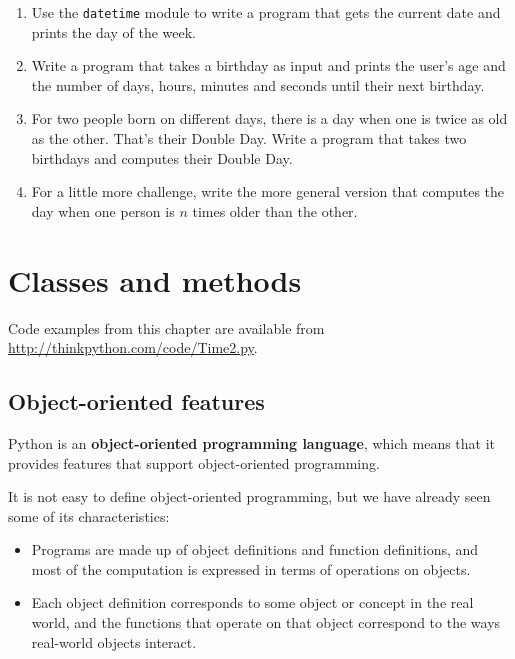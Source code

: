 \documentclass[10pt]{book}
\begin{document}
\begin{CJK}{UTF8}{gbsn}
\begin{exercise}
\begin{enumerate}

\item Use the {\tt datetime} module to write a program that gets the
  current date and prints the day of the week.

\item Write a program that takes a birthday as input and prints the
  user's age and the number of days, hours, minutes and seconds until
  their next birthday.

\item For two people born on different days, there is a day when one
  is twice as old as the other. That's their Double Day.  Write a
  program that takes two birthdays and computes their Double Day.

\item For a little more challenge, write the more general version that
  computes the day when one person is $n$ times older than the other.

\end{enumerate}

\end{exercise}


\chapter{Classes and methods}

Code examples from this chapter are available from
\url{http://thinkpython.com/code/Time2.py}.

\section{Object-oriented features}

Python is an {\bf object-oriented programming language}, which means
that it provides features that support object-oriented
programming.

It is not easy to define object-oriented programming, but we have
already seen some of its characteristics:

\begin{itemize}

\item Programs are made up of object definitions and function
definitions, and most of the computation is expressed in terms
of operations on objects.

\item Each object definition corresponds to some object or concept
in the real world, and the functions that operate on that object
correspond to the ways real-world objects interact.


\end{itemize}
\end{CJK}
\end{document}
